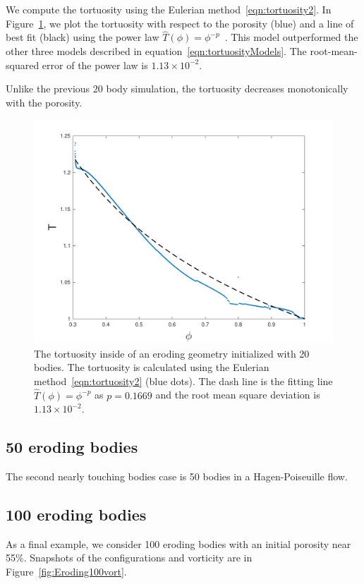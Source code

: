 \documentclass[preprint, 10pt]{elsarticle}
\begin{document}
We compute the tortuosity using the Eulerian
method~\eqref{eqn:tortuosity2}. In Figure~\ref{fig:ErodingLow20tort}, we
plot the tortuosity with respect to the porosity (blue) and a line of
best fit (black) using the power law $\widehat{T}(\phi) =
\phi^{-p}$~\cite{matyka2008tortuosity}.  This model outperformed the
other three models described in equation~\eqref{eqn:tortuosityModels}.
The root-mean-squared error of the power law is $1.13 \times 10^{-2}$.

Unlike the previous 20 body simulation, the tortuosity decreases
monotonically with the porosity. 

\begin{figure}[H]
\center
\includegraphics*[width =0.5\linewidth]{./figs/tort_eulerian20b}
\caption{\label{fig:ErodingLow20tort} The tortuosity inside of an
eroding geometry initialized with 20 bodies.  The tortuosity is
calculated using the Eulerian method~\eqref{eqn:tortuosity2} (blue
dots).  The dash line is the fitting line $\widehat{T}(\phi)=\phi^{-p}$
as $p=0.1669$ and the root mean square deviation is $1.13 \times
10^{-2}$.}
\end{figure}



\subsection{50 eroding bodies}
{\color{red}
The second nearly touching bodies case is 50 bodies in a Hagen-Poiseuille flow.
}

\subsection{100 eroding bodies}
As a final example, we consider 100 eroding bodies with an initial
porosity near 55\%.  Snapshots of the configurations and vorticity are
in Figure~\ref{fig:Eroding100vort}.
\end{document}
